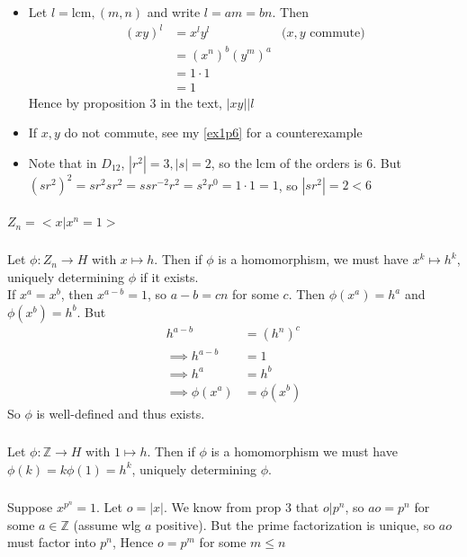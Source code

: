 \documentclass{article}
\newcommand{\ints}{\mathbb{Z}}
\newcommand{\lcm}{ \textrm{lcm}, }
\newcommand{\norm}[1]{|#1|}
\newcommand{\divides}{\big\vert}
\newcommand{\cyclic}[1]{<#1>}
\begin{document}
\subsubsection{}\label{ex3p16}
\begin{itemize}
\item Let $l = \lcm(m,n)$ and write $l=am=bn$. Then
\begin{align*}
(xy)^l &= x^ly^l & \mbox{($x,y$ commute)}\\
&= (x^n)^b(y^m)^a\\
&= 1\cdot 1\\
&= 1
\end{align*}
Hence by proposition 3 in the text, $\norm{xy} \divides l$
\item If $x,y$ do not commute, see my \ref{ex1p6} for a counterexample
\item Note that in $D_{12}$, $\norm{r^2} = 3, \norm{s}=2$, so the lcm of the orders is $6$. But $(sr^2)^2 = sr^2sr^2 = ssr^{-2}r^2 = s^2r^0 = 1\cdot 1 = 1$, so $\norm{sr^2} = 2 < 6$
\end{itemize}
\subsubsection{}\label{ex3p17}
$Z_n = \cyclic{x | x^n=1 }$
\subsubsection{}\label{ex3p18}
Let $\phi: Z_n \to H$ with $x \mapsto h$. Then if $\phi$ is a homomorphism, we must have $x^k \mapsto h^k$, uniquely determining $\phi$ if it exists.\\
If $x^a = x^b$, then $x^{a-b}=1$, so $a-b=cn$ for some $c$. Then $\phi(x^a)=h^a$ and $\phi(x^b)=h^b$. But 
\begin{align*}
h^{a-b} &= (h^n)^c\\
\implies h^{a-b} &= 1\\
\implies h^a &= h^b\\
\implies \phi(x^a) &= \phi(x^b)
\end{align*}
So $\phi$ is well-defined and thus exists.
\subsubsection{}\label{ex3p19}
Let $\phi: \ints \to H$ with $1\mapsto h$. Then if $\phi$ is a homomorphism we must have $\phi(k)=k\phi(1)=h^k$, uniquely determining $\phi$.
\subsubsection{}\label{ex3p20}
Suppose $x^{p^n} = 1$. Let $o=\norm{x}$. We know from prop 3 that $o \divides p^n$, so $ao = p^n$ for some $a \in \ints$ (assume wlg $a$ positive). But the prime factorization is unique, so $ao$ must factor into $p^n$, Hence $o=p^m$ for some $m\leq n$
\end{document}
